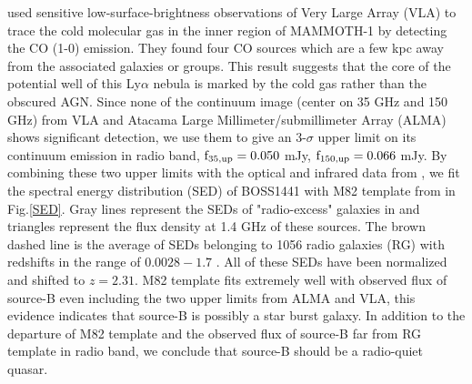 \documentclass[../Results.tex]{subfiles}
\begin{document}
	\cite{emonts2019cold} used sensitive low-surface-brightness observations of Very Large Array (VLA) to trace the cold molecular gas in the inner region of MAMMOTH-1 by detecting the CO (1-0) emission. They found four CO sources which are a few kpc away from the associated galaxies or groups. This result suggests that the core of the potential well of this Ly$\alpha$ nebula is marked by the cold gas rather than the obscured AGN. Since none of the continuum image (center on 35 GHz and 150 GHz) from VLA and Atacama Large Millimeter/submillimeter Array (ALMA) shows significant detection, we use them to give an 3-$\sigma$ upper limit on its continuum emission in radio band, $\rm f_{35,up}=0.050$ mJy, $\rm f_{150,up}=0.066$ mJy. By combining these two upper limits with the optical and infrared data from \citet{arrigoni2018overdensity}, we fit the spectral energy distribution (SED) of BOSS1441 with M82 template from \cite{Silva_1998} in Fig.\ref{SED}. Gray lines represent the SEDs of "radio-excess" galaxies in \citet{harrison2014kiloparsec} and triangles represent the flux density at 1.4 GHz of these sources. The brown dashed line is the average of SEDs belonging to 1056 radio galaxies (RG) with redshifts in the range of $0.0028-1.7$ \citep{Toba_2019}. All of these SEDs have been normalized and shifted to $z=2.31$. M82 template fits extremely well with observed flux of source-B even including the two upper limits from ALMA and VLA, this evidence indicates that source-B is possibly a star burst galaxy. In addition to the departure of M82 template and the observed flux of source-B far from RG template in radio band, we conclude that source-B should be a radio-quiet quasar.
	
\end{document}
